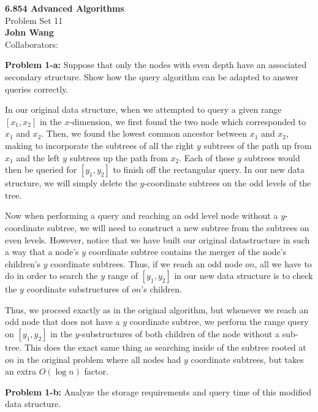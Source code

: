 \documentclass[psamsfonts]{amsart}
\newenvironment{sol}{\vspace{0.25cm}{\large \bfseries Solution:}}{\qedsymbol}
\newenvironment{prob}[1]{\begin{framed}{\large \bfseries Problem #1:}}{\end{framed}}
\newcommand{\makenewtitle}{
    \begin{center}
    {\huge \bfseries 6.854 Advanced Algorithms} \\
    Problem Set 11\\
    \vspace{0.25cm}
    {\bfseries John Wang} \\
    Collaborators:  
    \end{center}
    \vspace{0.5cm}
}
\begin{document}
\makenewtitle

\begin{prob}{1-a}
Suppose that only the nodes with even depth have an associated secondary structure. Show how the query algorithm can be adapted to answer queries correctly.
\end{prob}
\begin{sol}
In our original data structure, when we attempted to query a given range $[x_1, x_2]$ in the $x$-dimension, we first found the two node which corresponded to $x_1$ and $x_2$. Then, we found the lowest common ancestor between $x_1$ and $x_2$, making to incorporate the subtrees of all the right $y$ subtrees of the path up from $x_1$ and the left $y$ subtrees up the path from $x_2$. Each of these $y$ subtrees would then be queried for $[y_1, y_2]$ to finish off the rectangular query. In our new data structure, we will simply delete the $y$-coordinate subtrees on the odd levels of the tree. 

Now when performing a query and reaching an odd level node without a $y$-coordinate subtree, we will need to construct a new subtree from the subtrees on even levels. However, notice that we have built our original datastructure in such a way that a node's $y$ coordinate subtree contains the merger of the node's children's $y$ coordinate subtrees. Thus, if we reach an odd node $on$, all we have to do in order to search the $y$ range of $[y_1, y_2]$ in our new data structure is to check the $y$ coordinate substructures of $on$'s children.

Thus, we proceed exactly as in the original algorithm, but whenever we reach an odd node that does not have a $y$ coordinate subtree, we perform the range query on $[y_1, y_2]$ in the $y$-substructures of both children of the node without a sub-tree. This does the exact same thing as searching inside of the subtree rooted at $on$ in the original problem where all nodes had $y$ coordinate subtrees, but takes an extra $O(\log n)$ factor.
\end{sol}

\begin{prob}{1-b}
Analyze the storage requirements and query time of this modified data structure.
\end{prob}
\begin{sol}

\end{sol}
\end{document}
